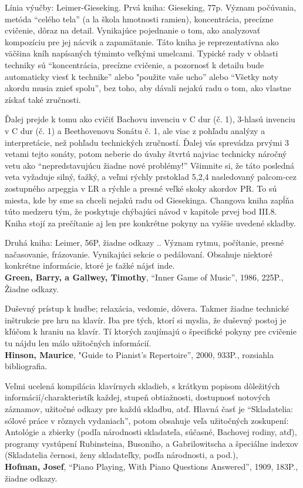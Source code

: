 Línia výučby: Leimer-Gieseking. Prvá kniha: Gieseking, 77p. Význam počúvania, metóda “celého tela” (a la škola hmotnosti ramien), koncentrácia, precízne cvičenie, dôraz na detail. Vynikajúce pojednanie o tom, ako analyzovať kompozíciu pre jej nácvik a zapamätanie. Táto kniha je reprezentatívna ako väčšina kníh napísaných týmimto veľkými umelcami. Typické rady v oblasti techniky sú “koncentrácia, precízne cvičenie, a pozornosť k detailu bude automaticky viesť k technike” alebo "použite vaše ucho” alebo “Všetky noty akordu musia znieť spolu”, bez toho, aby dávali nejakú radu o tom, ako vlastne získať také zručnosti. 

Ďalej prejde k tomu ako cvičiť Bachovu invenciu v C dur (č. 1), 3-hlasú invenciu v C dur (č. 1) a Beethovenovu Sonátu č. 1, ale viac z pohľadu analýzy a interpretácie, než pohľadu technických zručností. Ďalej vás sprevádza prvými 3 vetami tejto sonáty, potom neberie do úvahy štvrtú najviac technicky náročný vetu ako “nepredstavujúcu žiadne nové problémy!” Všimnite si, že táto posledná veta  vyžaduje silný, ťažký, a veľmi rýchly prstoklad 5,2,4 nasledovaný palcom-cez zostupného arpeggia v ĽR a rýchle a presné veľké skoky akordov PR. To sú miesta, kde by sme sa chceli nejakú radu od Giesekinga. Changova kniha zapĺňa túto medzeru tým, že poskytuje chýbajúci návod v kapitole prvej bod III.8. Kniha stojí za prečítanie aj len pre konkrétne pokyny na vyššie uvedené skladby. 

Druhá kniha: Leimer, 56P, žiadne odkazy .. Význam rytmu, počítanie, presné načasovanie, frázovanie. Vynikajúci sekcie o pedálovaní. Obsahuje niektoré konkrétne informácie, ktoré je ťažké nájsť inde.
\medskip\\
\textbf{Green, Barry, a Gallwey, Timothy}, “Inner Game of Music”, 1986, 225P., Žiadne odkazy. 

Duševný prístup k hudbe; relaxácia, vedomie, dôvera. Takmer žiadne technické inštrukcie pre hru na klavír. Iba pre tých, ktorí si myslia, že duševný postoj je kľúčom k hraniu na klavír. Tí ktorých zaujímajú o špecifické pokyny pre cvičenie tu nájdu len málo užitočných informácií.
\medskip\\
\textbf{Hinson, Maurice}, "Guide to Pianist’s Repertoire”, 2000, 933P., rozsiahla bibliografia. 

Veľmi ucelená kompilácia klavírnych skladieb, s krátkym popisom dôležitých informácií/charakteristík každej, stupeň obtiažnosti, dostupnosť notových záznamov, užitočné odkazy pre každú skladbu, atď. Hlavná časť je “Skladatelia: sólové práce v rôznych vydaniach”, potom obsahuje veľa užitočných zoskupení: Antológie a zbierky (podľa národnosti skladateľa, súčasné, Bachovej rodiny, atď), programy vystúpení Rubinsteina, Busoniho, a Gabrilowitscha a špeciálne indexov (Skladatelia černosi, ženy skladateľky, podľa národnosti, a pod.), 
\medskip\\
\textbf{Hofman, Josef}, “Piano Playing, With Piano Questions Answered”, 1909, 183P., žiadne odkazy.

